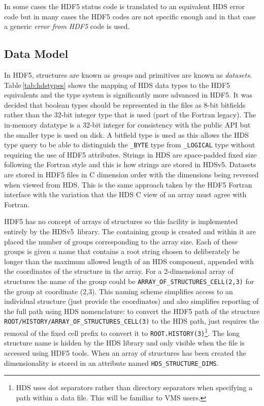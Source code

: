 \documentclass[final,authoryear,5p,times,twocolumn]{elsarticle}
\newcommand{\new}{HDSv5}
\begin{document}
In some cases the HDF5 status code is translated to an equivalent HDS
error code but in many cases the HDF5 codes are not specific enough
and in that case a generic \emph{error from HDF5} code is used.

\subsection{Data Model}

In HDF5, structures are known as \emph{groups} and primitives are
known as \emph{datasets}. Table\,\ref{tab:hdstypes} shows the mapping
of HDS data types to the HDF5 equivalents and the type system is
significantly more advanced in HDF5. It was decided that boolean types
should be represented in the files as 8-bit bitfields rather than the
32-bit integer type that is used (part of the Fortran legacy). The
in-memory datatype is a 32-bit integer for consistency with the public
API but the smaller type is used on disk. A bitfield type is used as
this allows the HDS type query to be able to distinguish the
\texttt{\_BYTE} type from \texttt{\_LOGICAL} type without requiring
the use of HDF5 attributes. Strings in HDS are space-padded fixed size
following the Fortran style and this is how strings are stored in
\new. Datasets are stored in HDF5 files in C dimension order with the
dimensions being reversed when viewed from HDS. This is the same
approach taken by the HDF5 Fortran interface with the variation that
the HDS C view of an array must agree with Fortran.

HDF5 has no concept of arrays of structures so this facility is
implemented entirely by the \new\ library. The containing group is
created and within it are placed the number of groups corresponding to
the array size. Each of these groups is given a name that contains a
root string chosen to deliberately be longer than the maximum allowed
length of an HDS component, appended with the coordinates of the
structure in the array. For a 2-dimensional array of structures the
name of the group could be \texttt{ARRAY\_OF\_STRUCTURES\_CELL(2,3)}
for the group at coordinate (2,3). This naming scheme simplifies
access to an individual structure (just provide the coordinates) and
also simplifies reporting of the full path using HDS nomenclature: to
convert the HDF5 path of the structure
\texttt{ROOT/HISTORY/ARRAY\_OF\_STRUCTURES\_CELL(3)} to the HDS path,
just requires the removal of the fixed cell prefix to convert it to
\texttt{ROOT.HISTORY(3)}\footnote{HDS uses dot separators rather than
  directory separators when specifying a path within a data file. This
  will be familiar to VMS users.}. The
long structure name is hidden by the HDS library and only visible when
the file is accessed using HDF5 tools. When an array of structures has
been created the dimensionality is stored in an attribute named
\texttt{HDS\_STRUCTURE\_DIMS}.
\end{document}
